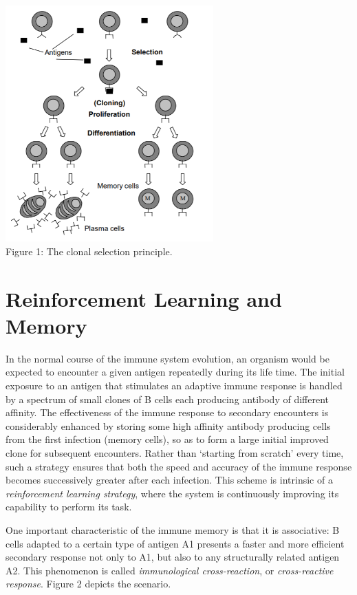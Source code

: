 \documentclass{article}
\begin{document}
\begin{center} 
\includegraphics[width=8cm,clip]{images/cj_clone_selection_p.png}\\
\caption{Figure 1: The clonal selection principle.}	
\end{center} 


\section{Reinforcement Learning and Memory}
In the normal course of the immune system evolution, an organism would be expected to encounter a given antigen repeatedly during its life time. The initial exposure to an antigen that stimulates an adaptive immune response is handled by a spectrum of small clones of B cells each producing antibody of different affinity. The effectiveness of the immune response to secondary encounters is considerably enhanced by storing some high affinity antibody producing cells from the first infection (memory cells), so as to form a large initial improved clone for subsequent encounters. Rather than ‘starting from scratch’ every time, such a strategy ensures that both the speed and accuracy of the immune response becomes successively greater after each infection. This scheme is intrinsic of a \textsl{reinforcement learning strategy}, where the system is continuously improving its capability to perform its task.

One important characteristic of the immune memory is that it is associative: B cells adapted to a certain type of antigen A1 presents a faster and more efficient secondary response not only to A1, but also to any structurally related antigen A2. This phenomenon is called \textsl{immunological cross-reaction}, or \textsl{cross-reactive response}. Figure 2 depicts the scenario.
\end{document}
